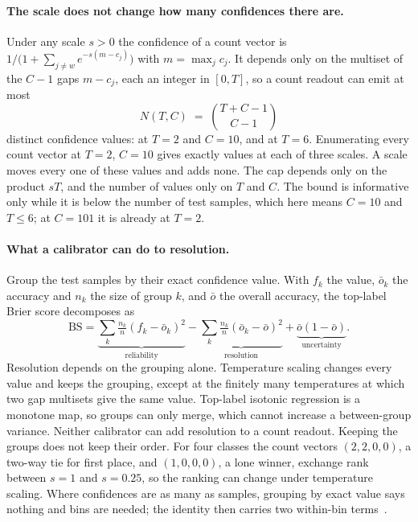 \documentclass[10pt]{article}
\begin{document}
\paragraph{The scale does not change how many confidences there are.}
Under any scale $s>0$ the confidence of a count vector is
$1/\big(1+\sum_{j\ne w}e^{-s(m-c_j)}\big)$ with $m=\max_j c_j$. It depends only on the multiset
of the $C-1$ gaps $m-c_j$, each an integer in $[0,T]$, so a count readout can emit at most
\begin{equation}
\label{eq:levels}
N(T,C) \;=\; \binom{T+C-1}{C-1}
\end{equation}
distinct confidence values: \levelsTenTwo{} at $T=2$ and $C=10$, and \levelsTenSix{} at $T=6$. %
Enumerating every count vector at $T=2$, $C=10$ gives exactly \levelsTenTwo{} values at each of %
three scales. A scale moves every one of these values and adds none. The cap depends only on the
product $sT$, and the number of values only on $T$ and $C$. The bound is informative only while it is below
the number of test samples, which here means $C=10$ and $T\le6$; at $C=101$ it is already
\levelsHundredOneTwo{} at $T=2$. %

\paragraph{What a calibrator can do to resolution.}
Group the test samples by their exact confidence value. With $f_k$ the value, $\bar o_k$ the
accuracy and $n_k$ the size of group $k$, and $\bar o$ the overall accuracy, the top-label
Brier score decomposes as~\citep{murphy1973partition} %
\begin{equation}
\label{eq:murphy}
\mathrm{BS} = \underbrace{\sum_k \tfrac{n_k}{n}(f_k-\bar o_k)^2}_{\text{reliability}}
 - \underbrace{\sum_k \tfrac{n_k}{n}(\bar o_k-\bar o)^2}_{\text{resolution}}
 + \underbrace{\bar o(1-\bar o)}_{\text{uncertainty}} .
\end{equation}
Resolution depends on the grouping alone. Temperature scaling changes every
value and keeps the grouping, except at the finitely many temperatures at which two gap
multisets give the same value. Top-label isotonic regression is a monotone map, so groups can
only merge, which cannot increase a between-group variance. Neither calibrator can add
resolution to a count readout. Keeping the groups does not keep their order. For four classes the
count vectors $(2,2,0,0)$, a two-way tie for first place, and $(1,0,0,0)$, a lone winner, exchange
rank between $s=1$ and $s=0.25$, so the ranking can change under temperature scaling. %
Where confidences are as many as samples, grouping
by exact value says nothing and bins are needed; the identity then carries two within-bin
terms~\citep{stephenson2008two}. %
\end{document}
